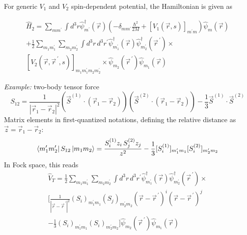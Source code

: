 \documentclass[12pt]{article}
\newcommand{\be}{\begin{equation}}
\newcommand{\ee}{\end{equation}}
\newcommand{\vecrp}{\ensuremath{\vec{r}^{\,\prime}}}
\begin{document}
For generic $V_1$ and $V_2$ spin-dependent potential,
the Hamiltonian is given as

\be
\begin{gathered}
\hat{H}_2 = \sum_{mm^\prime} \int d^3r
\hat{\psi}_{m^{\prime}}^{\dagger}(\vec{r})
\left(
-\delta_{mm^\prime}\frac{\hbar^2}{2M} + 
[V_1(\vec{r},s)]_{m^\prime m}
\right)
\hat{\psi}_{m}(\vec{r})\\
+\frac{1}{2} \sum_{m_1m_1^\prime}\sum_{m_2m_2^\prime} \int d^3r\,d^3r^\prime
\hat{\psi}_{m_1^\prime}^{\dagger}(\vec{r}) \hat{\psi}_{m_2^\prime}^{\dagger}(\vecrp)
\times\\
[V_2(\vec{r},\vecrp,s)]_{m_1m_1^\prime m_2m_2^\prime}
\times \hat{\psi}_{m_2}(\vecrp)\hat{\psi}_{m_1}(\vec{r})
\end{gathered}
\label{eq:g125}
\ee

\emph{Example:} two-body tensor force
\be
S_{12}=\frac{1}{\left|\vec{r}_{1}-\vec{r}_{2}\right|^{2}} 
\left(\vec{S}^{(1)} \cdot\left(\vec{r}_{1}-\vec{r}_{2}\right)\right)
\left(\vec{S}^{(2)} \cdot\left(\vec{r}_{1}-\vec{r}_{2}\right)\right)
-\frac{1}{3} \vec{S}^{(1)} \cdot \vec{S}^{(2)}
\ee
Matrix elements in first-quantized notations, defining
the relative distance as $\vec{z} = \vec{r}_1 - \vec{r}_2$:
\be
\bra{m_1^\prime m_2^\prime} S_{12} \ket{m_1m_2} =
\frac{S_i^{(1)} z_i\,S_j^{(2)} z_j}{z^2} - \frac{1}{3} [S_i^{(1)}]_{m_1^\prime m_1} [S_i^{(2)}]_{m_2^\prime m_2}
\ee
In Fock space, this reads
\be
\begin{gathered}
\hat{V}_T =
\frac{1}{2} \sum_{m_1m_1^\prime}\sum_{m_2m_2^\prime} \int d^3r\,d^3r^\prime
\hat{\psi}_{m_1^\prime}^{\dagger}(\vec{r}) \hat{\psi}_{m_2^\prime}^{\dagger}(\vecrp)\times\\
\bigg[
\frac{1}{|\vec{r}-\vecrp|^2} (S_i)_{m_1^\prime m_1} (S_j)_{m_2^\prime m_2}
(\vec{r}-\vecrp)^i (\vec{r}-\vecrp)^j\\
- \frac{1}{3} (S_i)_{m_1^\prime m_1} (S_i)_{m_2^\prime m_2}
\bigg]
\hat{\psi}_{m_2}(\vecrp)\hat{\psi}_{m_1}(\vec{r})
\end{gathered}
\ee

\end{document}

